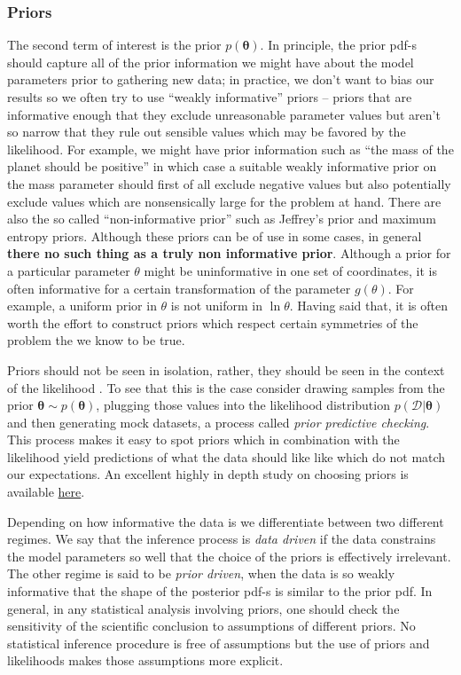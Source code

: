\documentclass[12pt,dvipsnames]{report}
\renewcommand{\vec}[1]{\boldsymbol{\mathbf{#1}}}
\begin{document}
\subsubsection{Priors}
The second term of interest is the prior $p(\vec{\theta})$. In principle, the
prior pdf-s should capture all of the prior information we might have about the
model parameters prior to gathering new data; in practice, we don't want to
bias our results so we often try to use ``weakly informative'' priors -- priors
that are informative enough that they exclude unreasonable parameter values but
aren't so narrow that they rule out sensible values which may be favored by the
likelihood. For example, we might have prior information such as ``the mass of
the planet should be positive'' in which case a suitable weakly informative
prior on the mass parameter should first of all exclude negative values but
also potentially exclude values which are nonsensically large for the problem
at hand. There are also the so called ``non-informative prior'' such as
Jeffrey's prior and maximum entropy priors. Although these priors can be of use
in some cases, in general \textbf{there no such thing as a truly non
    informative prior}. Although a prior for a particular parameter $\theta$ might
be uninformative in one set of coordinates, it is often informative for a
certain transformation of the parameter $g(\theta)$. For example, a uniform
prior in $\theta$ is not uniform in $\ln\theta$. Having said that, it is often
worth the effort to construct priors which respect certain symmetries of the
problem the we know to be true.

Priors should not be seen in isolation, rather, they should be seen in the
context of the likelihood \citep{arXiv:1708.07487}. To see that this is the
case consider drawing samples from the prior $\vec{\theta}\sim
    p(\vec{\theta})$, plugging those values into the likelihood distribution
$p(\mathcal{D}|\vec{\theta})$ and then generating mock datasets, a process
called \emph{prior predictive checking}. This process makes it easy to spot
priors which in combination with the likelihood yield predictions of what the
data should like like which do not match our expectations. An excellent highly
in depth study on choosing priors is available
\href{https://betanalpha.github.io/assets/case_studies/prior_modeling.html}{here}.

Depending on how informative the data is we differentiate between two different
regimes. We say that the inference process is \emph{data driven} if the data
constrains the model parameters so well that the choice of the priors is
effectively irrelevant. The other regime is said to be \emph{prior driven},
when the data is so weakly informative that the shape of the posterior pdf-s is
similar to the prior pdf. In general, in any statistical analysis involving
priors, one should check the sensitivity of the scientific conclusion to
assumptions of different priors. No statistical inference procedure is free of
assumptions but the use of priors and likelihoods makes those assumptions more
explicit.
\end{document}
